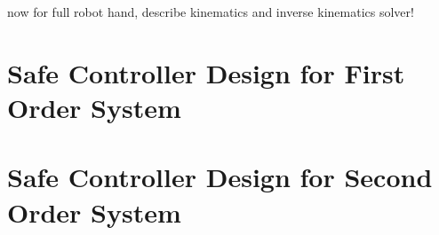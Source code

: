 now for full robot hand, describe kinematics and inverse kinematics solver!

\section{Safe Controller Design for First Order System}

\section{Safe Controller Design for Second Order System}